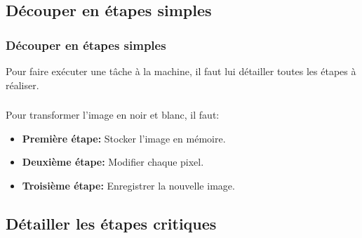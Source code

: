 \documentclass[svgnames,11pt]{beamer}
\begin{document}
\subsection{Découper en étapes simples}
\begin{frame}
    \frametitle{Découper en étapes simples}

    \begin{aretenir}[]
        Pour faire exécuter une tâche à la machine, il faut lui détailler toutes les étapes à réaliser.
    \end{aretenir}

\end{frame}
\begin{frame}
    \frametitle{}

    Pour transformer l'image en noir et blanc, il faut:
    \begin{itemize}
        \item \textbf{Première étape:} Stocker l'image en mémoire.
        \item \textbf{Deuxième étape:} Modifier chaque pixel.
        \item \textbf{Troisième étape:} Enregistrer la nouvelle image.
    \end{itemize}

\end{frame}
\subsection{Détailler les étapes critiques}
\end{document}

